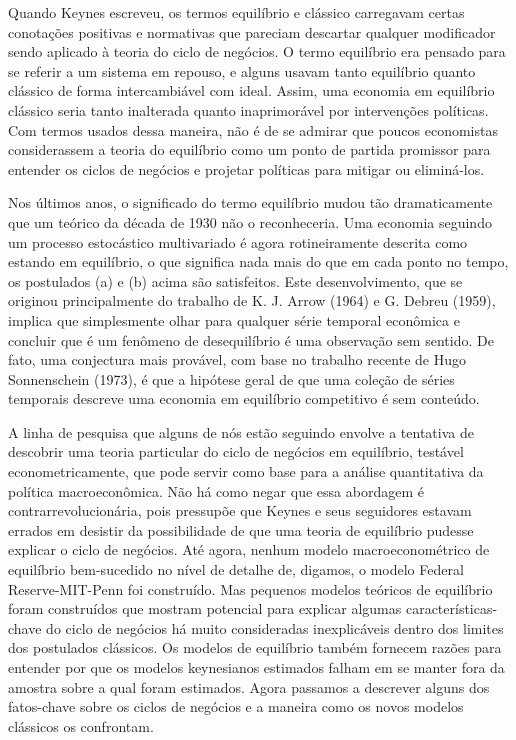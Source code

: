 \documentclass[12pt]{article}
\begin{document}
Quando Keynes escreveu, os termos equilíbrio e clássico carregavam certas conotações positivas e normativas que pareciam descartar qualquer modificador sendo aplicado à teoria do ciclo de negócios. O termo equilíbrio era pensado para se referir a um sistema em repouso, e alguns usavam tanto equilíbrio quanto clássico de forma intercambiável com ideal. Assim, uma economia em equilíbrio clássico seria tanto inalterada quanto inaprimorável por intervenções políticas. Com termos usados dessa maneira, não é de se admirar que poucos economistas considerassem a teoria do equilíbrio como um ponto de partida promissor para entender os ciclos de negócios e projetar políticas para mitigar ou eliminá-los.

Nos últimos anos, o significado do termo equilíbrio mudou tão dramaticamente que um teórico da década de 1930 não o reconheceria. Uma economia seguindo um processo estocástico multivariado é agora rotineiramente descrita como estando em equilíbrio, o que significa nada mais do que em cada ponto no tempo, os postulados (a) e (b) acima são satisfeitos. Este desenvolvimento, que se originou principalmente do trabalho de K. J. Arrow (1964) e G. Debreu (1959), implica que simplesmente olhar para qualquer série temporal econômica e concluir que é um fenômeno de desequilíbrio é uma observação sem sentido. De fato, uma conjectura mais provável, com base no trabalho recente de Hugo Sonnenschein (1973), é que a hipótese geral de que uma coleção de séries temporais descreve uma economia em equilíbrio competitivo é sem conteúdo.

A linha de pesquisa que alguns de nós estão seguindo envolve a tentativa de descobrir uma teoria particular do ciclo de negócios em equilíbrio, testável econometricamente, que pode servir como base para a análise quantitativa da política macroeconômica. Não há como negar que essa abordagem é contrarrevolucionária, pois pressupõe que Keynes e seus seguidores estavam errados em desistir da possibilidade de que uma teoria de equilíbrio pudesse explicar o ciclo de negócios. Até agora, nenhum modelo macroeconométrico de equilíbrio bem-sucedido no nível de detalhe de, digamos, o modelo Federal Reserve-MIT-Penn foi construído. Mas pequenos modelos teóricos de equilíbrio foram construídos que mostram potencial para explicar algumas características-chave do ciclo de negócios há muito consideradas inexplicáveis dentro dos limites dos postulados clássicos. Os modelos de equilíbrio também fornecem razões para entender por que os modelos keynesianos estimados falham em se manter fora da amostra sobre a qual foram estimados. Agora passamos a descrever alguns dos fatos-chave sobre os ciclos de negócios e a maneira como os novos modelos clássicos os confrontam.
\end{document}
